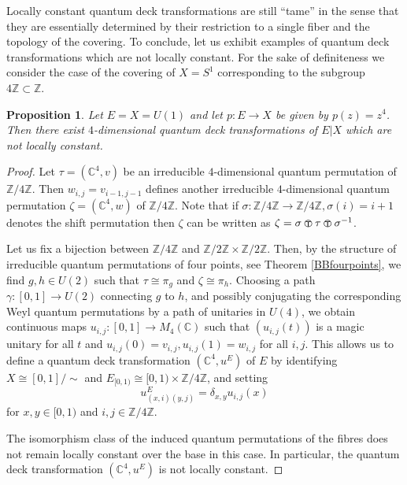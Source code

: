 \documentclass[a4paper]{amsart}
\newcommand{\tp}{\!\!
{\scriptstyle
\text{
\raisebox{0.7pt}{
\textcircled{\raisebox{-1.3pt}{$\mathsf{T}$}}
} 
} 
} 
\!\!}
\numberwithin{equation}{section}
\theoremstyle{change}
\newtheorem{prop}[theorem]{Proposition}
\begin{document}
Locally constant quantum deck transformations are still ``tame'' in the sense that they are essentially determined by their restriction to a single fiber and the topology of the covering. 
To conclude, let us exhibit examples of quantum deck transformations which are not locally constant. For the sake of definiteness we consider the case of the 
covering of $ X = S^1 $ corresponding to the subgroup $ 4 \mathbb{Z} \subset \mathbb{Z} $. 

\begin{prop} \label{foursheetedcovering}
Let $ E = X = U(1) $ and let $ p: E \rightarrow X $ be given by $ p(z) = z^4 $. Then there 
exist $ 4 $-dimensional quantum deck transformations of $ E|X $ which are not locally constant. 
\end{prop} 

\begin{proof} 
Let $ \tau = (\mathbb{C}^4, v) $ be an irreducible $ 4 $-dimensional quantum permutation of $ \mathbb{Z}/4 \mathbb{Z} $. Then $ w_{i,j} = v_{i - 1, j - 1} $ defines another irreducible $ 4 $-dimensional quantum permutation $ \zeta = (\mathbb{C}^4, w) $ of $ \mathbb{Z}/4 \mathbb{Z} $. Note that if $ \sigma: \mathbb{Z}/4 \mathbb{Z} \rightarrow \mathbb{Z}/4 \mathbb{Z}, \sigma(i) = i + 1 $ denotes the shift 
permutation then $ \zeta $ can be written as $ \zeta = \sigma \tp \tau \tp \sigma^{-1} $. 

Let us fix a bijection between $ \mathbb{Z}/4\mathbb{Z} $ and $ \mathbb{Z}/2 \mathbb{Z} \times \mathbb{Z}/2\mathbb{Z} $. Then, by the structure of irreducible quantum permutations of four points, see Theorem \ref{BBfourpoints}, we find $ g, h \in U(2) $ such that $ \tau \cong \pi_g $ 
and $ \zeta \cong \pi_h $. 
Choosing a path $ \gamma: [0,1] \rightarrow U(2) $ connecting $ g $ to $ h $, and possibly conjugating the corresponding Weyl quantum permutations by a path of unitaries in $ U(4) $,
we obtain continuous maps $ u_{i,j}: [0,1] \rightarrow M_4(\mathbb{C}) $ such that $ (u_{i,j}(t)) $ is a magic unitary for all $ t $ 
and $ u_{i,j}(0) = v_{i,j}, u_{i,j}(1) = w_{i,j} $ for all $ i,j $. This allows us to define a quantum deck transformation $ (\mathbb{C}^4, u^E) $ of $ E $ by identifying $ X \cong [0,1]/\sim $ and  
$ E_{[0,1)} \cong [0,1) \times \mathbb{Z}/4 \mathbb{Z} $, and setting  
$$
u^E_{(x,i)(y,j)} = \delta_{x,y} u_{i,j}(x)
$$
for $ x,y \in [0, 1) $ and $ i,j \in \mathbb{Z}/4\mathbb{Z} $. 

The isomorphism class of the induced quantum permutations of the fibres does not remain locally constant over the base in this case. In particular, the quantum deck transformation $ (\mathbb{C}^4, u^E) $ is not locally constant.  
\end{proof} 
\end{document}
